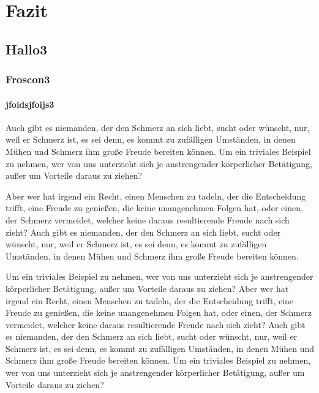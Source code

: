 \documentclass[12pt]{scrreprt}
\begin{document}
\chapter{Fazit}

\section{Hallo3}

\subsection{Froscon3}

\subsubsection{jfoidsjfoijs3}

Auch gibt es niemanden, der den Schmerz an sich liebt, sucht oder wünscht, nur, weil er Schmerz ist, es sei denn, es kommt zu zufälligen Umständen, in denen Mühen und Schmerz ihm große Freude bereiten können. Um ein triviales Beispiel zu nehmen, wer von uns unterzieht sich je anstrengender körperlicher Betätigung, außer um Vorteile daraus zu ziehen?

Aber wer hat irgend ein Recht, einen Menschen zu tadeln, der die Entscheidung trifft, eine Freude zu genießen, die keine unangenehmen Folgen hat, oder einen, der Schmerz vermeidet, welcher keine daraus resultierende Freude nach sich zieht? Auch gibt es niemanden, der den Schmerz an sich liebt, sucht oder wünscht, nur, weil er Schmerz ist, es sei denn, es kommt zu zufälligen Umständen, in denen Mühen und Schmerz ihm große Freude bereiten können.

Um ein triviales Beispiel zu nehmen, wer von uns unterzieht sich je anstrengender körperlicher Betätigung, außer um Vorteile daraus zu ziehen? Aber wer hat irgend ein Recht, einen Menschen zu tadeln, der die Entscheidung trifft, eine Freude zu genießen, die keine unangenehmen Folgen hat, oder einen, der Schmerz vermeidet, welcher keine daraus resultierende Freude nach sich zieht? Auch gibt es niemanden, der den Schmerz an sich liebt, sucht oder wünscht, nur, weil er Schmerz ist, es sei denn, es kommt zu zufälligen Umständen, in denen Mühen und Schmerz ihm große Freude bereiten können. Um ein triviales Beispiel zu nehmen, wer von uns unterzieht sich je anstrengender körperlicher Betätigung, außer um Vorteile daraus zu ziehen?
\end{document}
